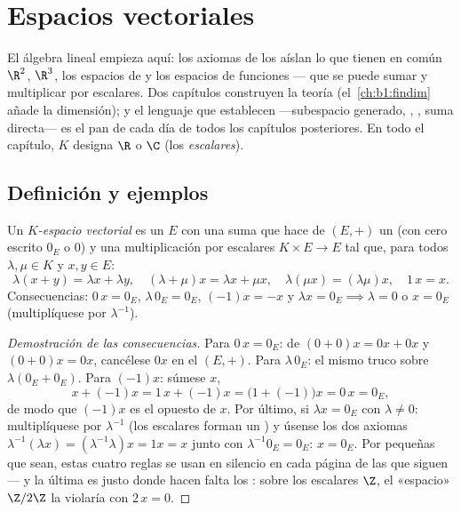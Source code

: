 \chapter{Espacios vectoriales}\label{ch:b1:vspaces}

El álgebra lineal empieza aquí: los axiomas de los  aíslan lo que tienen en común $\R^2$, $\R^3$, los
espacios de  y los espacios de funciones --- que se puede
sumar y multiplicar por escalares. Dos capítulos construyen la teoría
(el~\cref{ch:b1:findim} añade la dimensión); y el lenguaje que
establecen ---subespacio generado, , ,
suma directa--- es el pan de cada día de todos los capítulos
posteriores. En todo el capítulo, $K$ designa $\R$ o $\C$
(los \emph{escalares}).

\section{Definición y ejemplos}

\begin{definition}\label{def:b1:vspaces:def}
Un \emph{$K$-espacio vectorial} es un
 $E$ con una suma que hace de $(E, +)$ un 
(con cero escrito $0_E$ o $0$) y una multiplicación por escalares
$K \times E \to E$ tal que, para todos $\lambda, \mu \in K$ y
$x, y \in E$:
\[
\lambda(x + y) = \lambda x + \lambda y,\quad
(\lambda + \mu) x = \lambda x + \mu x,\quad
\lambda(\mu x) = (\lambda\mu) x,\quad
1\,x = x .
\]
Consecuencias: $0\,x = 0_E$, $\lambda\,0_E = 0_E$, $(-1)x = -x$ y
$\lambda x = 0_E \implies \lambda = 0$ o $x = 0_E$ (multiplíquese por
$\lambda^{-1}$).
\end{definition}

\begin{proof}[Demostración de las consecuencias]
Para $0\,x = 0_E$: de $(0 + 0)x = 0x + 0x$ y $(0+0)x = 0x$,
cancélese $0x$ en el  $(E, +)$. Para $\lambda\,0_E$: el mismo
truco sobre $\lambda(0_E + 0_E)$. Para $(-1)x$: súmese $x$,
\[
x + (-1)x = 1\,x + (-1)x = \bigl(1 + (-1)\bigr)x = 0\,x = 0_E ,
\]
de modo que $(-1)x$ es el opuesto de $x$. Por último, si
$\lambda x = 0_E$ con $\lambda \neq 0$: multiplíquese por
$\lambda^{-1}$ (los escalares forman un ) y úsense los dos
axiomas $\lambda^{-1}(\lambda x) = (\lambda^{-1}\lambda)x = 1x = x$
junto con $\lambda^{-1}0_E = 0_E$: $x = 0_E$. Por pequeñas que sean,
estas cuatro reglas se usan en silencio en cada página de las que
siguen --- y la última es justo donde hacen falta los : sobre
los escalares $\Z$, el «espacio» $\Z/2\Z$ la violaría con $2\,x = 0$.
\end{proof}

